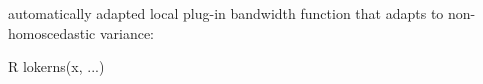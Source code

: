 \begin{defncbox}
    \begin{defnc}\label{defnc:lokerns}
        automatically adapted local plug-in bandwidth function that adapts to non-homoscedastic variance:
        \begin{mintlinebox}{R}
            lokerns(x, ...)
        \end{mintlinebox}
    \end{defnc}
\end{defncbox}
